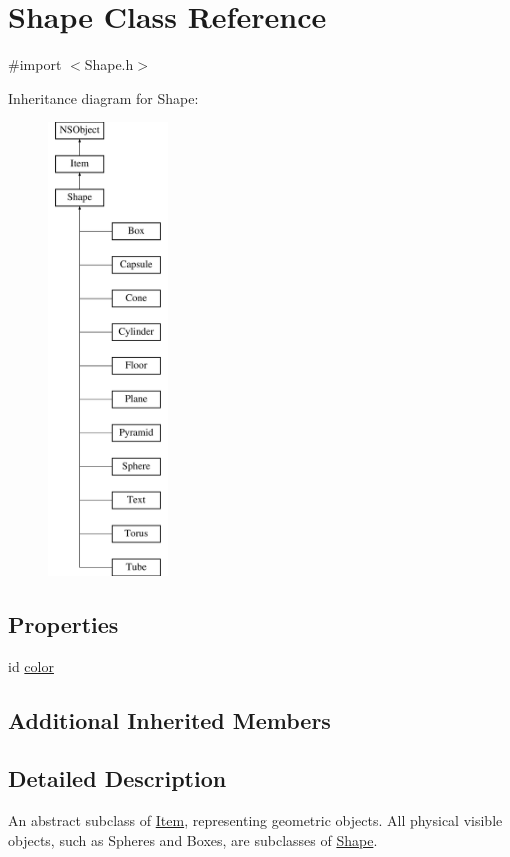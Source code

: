 \hypertarget{interface_shape}{}\section{Shape Class Reference}
\label{interface_shape}


{\ttfamily \#import $<$Shape.\+h$>$}

Inheritance diagram for Shape\+:\begin{figure}[H]
\begin{center}
\leavevmode
\includegraphics[height=12.000000cm]{interface_shape}
\end{center}
\end{figure}
\subsection*{Properties}
\begin{DoxyCompactItemize}
\item 
id \hyperlink{interface_shape_ab8fb9fc905556ecc76ad3d3df884793a}{color}
\end{DoxyCompactItemize}
\subsection*{Additional Inherited Members}


\subsection{Detailed Description}
An abstract subclass of {\ttfamily \hyperlink{interface_item}{Item}}, representing geometric objects. All physical visible objects, such as {\ttfamily Spheres} and {\ttfamily Boxes}, are subclasses of {\ttfamily \hyperlink{interface_shape}{Shape}}. 

